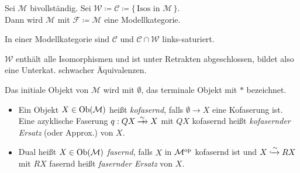 \documentclass{cheat-sheet}
\newcommand{\nspace}[1]{\foreach \i in {1,...,#1}{ \! }} %
\newcommand{\xtwoheadrightarrow}[1]{\xrightarrow{#1}\nspace{8}\to\,\,} %
\newcommand{\Weak}{\mathcal{W}} %
\newcommand{\Cof}{\mathcal{C}} %
\newcommand{\Fib}{\mathcal{F}} %
\newcommand{\ModC}{\mathcal{M}} %
\newenvironment{centertikzcd}
  {\begin{center}\begin{tikzcd}}
  {\end{tikzcd}\end{center}}
\begin{document}
\begin{bsp}
  Sei $\ModC$ bivollständig. Sei $\Weak \coloneqq \Cof \coloneqq \{ \, \text{Isos in $\ModC$} \, \}$. \\
  Dann wird $\ModC$ mit $\Fib \coloneqq \ModC$ eine Modellkategorie.
\end{bsp}

\begin{prop}
  In einer Modellkategorie sind $\Cof$ und $\Cof \cap \Weak$ links-saturiert.
\end{prop}

\begin{lem}
  $\Weak$ enthält alle Isomorphismen und ist unter Retrakten abgeschlossen, bildet also eine Unterkat. schwacher Äquivalenzen.
\end{lem}

\begin{nota}
  Das initiale Objekt von $\ModC$ wird mit $\emptyset$, das terminale Objekt mit $*$ bezeichnet.
\end{nota}

\begin{defn}
  \begin{itemize}
    \item Ein Objekt $X \in \Ob(\ModC)$ heißt \emph{kofasernd}, falls $\emptyset \to X$ eine Kofaserung ist.
    Eine azyklische Faserung $q : QX \xtwoheadrightarrow{{\sim}} X$ mit $QX$ kofasernd heißt \emph{kofasernder Ersatz} (oder Approx.) von $X$. \\
    \item Dual heißt $X \in \Ob(\ModC)$ \emph{fasernd}, falls $X$ in $\ModC^\op$ kofasernd ist und $X \xhookrightarrow{{\sim}} RX$ mit $RX$ fasernd heißt \emph{fasernder Ersatz} von $X$.
  \end{itemize}
\end{defn}

\end{document}
